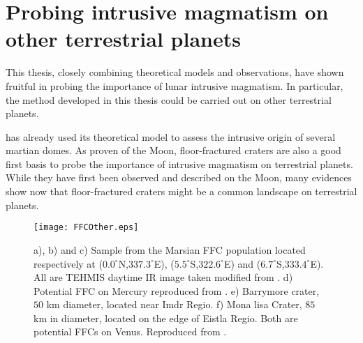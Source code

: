 \section{Probing intrusive magmatism on other terrestrial planets}
\label{sec:other-terr-plan}

This thesis,  closely combining  theoretical models  and observations,
have  shown fruitful  in  probing the  importance  of lunar  intrusive
magmatism. In particular, the method developed in this thesis could be
carried out on other terrestrial planets. 

\citet{Michaut:2013dr}  has  already  used its  theoretical  model  to
assess the intrusive origin of several martian domes. As proven of the
Moon, floor-fractured craters are also a good first basis to probe the
importance of intrusive magmatism  on terrestrial planets.  While they
have first  been observed  and described on  the Moon,  many evidences
show now that  floor-fractured craters might be a  common landscape on
terrestrial planets.

\begin{figure}[htpb]
  \begin{center}
    \graphicspath{ {/Users/thorey/Documents/These/Manuscript/Figure/Chapter7/} }
    \texttt{[image: FFCOther.eps]}
    \caption{a),  b) and  c) Sample  from the  Marsian FFC  population
      located  respectively  at ($0.0^{\circ}$N,$337.3  ^{\circ}  $E),
      ($5.5^{\circ}$S,$322.6         ^{\circ}          $E)         and
      ($6.7^{\circ}$S,$333.4^{\circ}$E).   All are  TEHMIS daytime  IR
      image taken modified from  \citet{Sato:2010ex}. d) Potential FFC
      on Mercury reproduced  from \citet{Schultz:1977ec}. e) Barrymore
      crater, $50$ km diameter, located  near Imdr Regio. f) Mona lisa
      Crater,  $85$ km  in diameter,  located  on the  edge of  Eistla
      Regio.   Both  are potential  FFCs  on  Venus.  Reproduced  from
      \citet{Wichman:1995ju}.}
    \label{C7-FFCOther}
  \end{center}
\end{figure}

